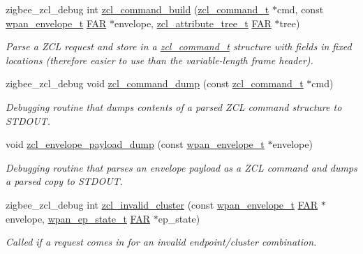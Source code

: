 \begin{DoxyCompactItemize}
zigbee\-\_\-zcl\-\_\-debug int \hyperlink{group__zcl_gadeb35ab493fffec9ba1c33f658929136}{zcl\-\_\-command\-\_\-build} (\hyperlink{structzcl__command__t}{zcl\-\_\-command\-\_\-t} $\ast$cmd, const \hyperlink{structwpan__envelope__t}{wpan\-\_\-envelope\-\_\-t} \hyperlink{group__hal_gaef060b3456fdcc093a7210a762d5f2ed}{F\-A\-R} $\ast$envelope, \hyperlink{structzcl__attribute__tree__t}{zcl\-\_\-attribute\-\_\-tree\-\_\-t} \hyperlink{group__hal_gaef060b3456fdcc093a7210a762d5f2ed}{F\-A\-R} $\ast$tree)
\begin{DoxyCompactList}\small\item\em Parse a Z\-C\-L request and store in a \hyperlink{structzcl__command__t}{zcl\-\_\-command\-\_\-t} structure with fields in fixed locations (therefore easier to use than the variable-\/length frame header). \end{DoxyCompactList}\item 
zigbee\-\_\-zcl\-\_\-debug void \hyperlink{group__zcl_gaca5c04dd787b041bf40f3b2a4463bb70}{zcl\-\_\-command\-\_\-dump} (const \hyperlink{structzcl__command__t}{zcl\-\_\-command\-\_\-t} $\ast$cmd)
\begin{DoxyCompactList}\small\item\em Debugging routine that dumps contents of a parsed Z\-C\-L command structure to S\-T\-D\-O\-U\-T. \end{DoxyCompactList}\item 
void \hyperlink{group__zcl_ga2057f6176d44e9fad2df4f619e5777d3}{zcl\-\_\-envelope\-\_\-payload\-\_\-dump} (const \hyperlink{structwpan__envelope__t}{wpan\-\_\-envelope\-\_\-t} $\ast$envelope)
\begin{DoxyCompactList}\small\item\em Debugging routine that parses an envelope payload as a Z\-C\-L command and dumps a parsed copy to S\-T\-D\-O\-U\-T. \end{DoxyCompactList}\item 
zigbee\-\_\-zcl\-\_\-debug int \hyperlink{group__zcl_ga23e4657d006b8b39ac54f0ee61786910}{zcl\-\_\-invalid\-\_\-cluster} (const \hyperlink{structwpan__envelope__t}{wpan\-\_\-envelope\-\_\-t} \hyperlink{group__hal_gaef060b3456fdcc093a7210a762d5f2ed}{F\-A\-R} $\ast$envelope, \hyperlink{structwpan__ep__state__t}{wpan\-\_\-ep\-\_\-state\-\_\-t} \hyperlink{group__hal_gaef060b3456fdcc093a7210a762d5f2ed}{F\-A\-R} $\ast$ep\-\_\-state)
\begin{DoxyCompactList}\small\item\em Called if a request comes in for an invalid endpoint/cluster combination. \end{DoxyCompactList}\item 

\end{DoxyCompactItemize}
